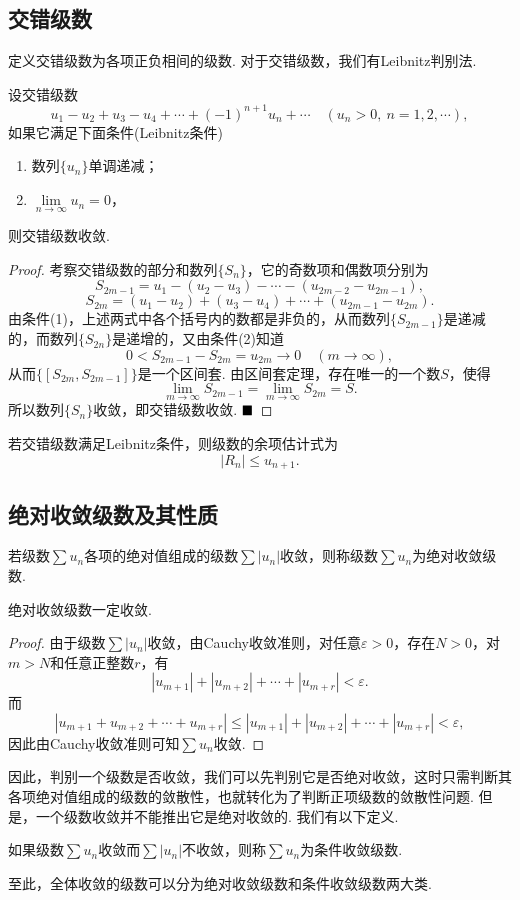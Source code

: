 \subsection{交错级数}
定义{\heiti 交错级数}为各项正负相间的级数. 对于交错级数，我们有Leibnitz判别法.
\begin{theorem}[Leibnitz判别法]
	设交错级数
	$$u_1-u_2+u_3-u_4+\cdots+(-1)^{n+1}u_n+\cdots\quad (u_n>0,\ n=1,2,\cdots),$$
	如果它满足下面条件(Leibnitz条件)
	\begin{enumerate}
		\item 数列$\{u_n\}$单调递减；
		\item $\lim\limits_{n\to\infty}u_n=0$，
	\end{enumerate}
	则交错级数收敛.
\end{theorem}
\begin{proof}
	考察交错级数的部分和数列$\{S_n\}$，它的奇数项和偶数项分别为
	$$S_{2m-1}=u_1-(u_2-u_3)-\cdots-(u_{2m-2}-u_{2m-1}),$$
	$$S_{2m}=(u_1-u_2)+(u_3-u_4)+\cdots+(u_{2m-1}-u_{2m}).$$
	由条件(1)，上述两式中各个括号内的数都是非负的，从而数列$\{S_{2m-1}\}$是递减的，而数列$\{S_{2n}\}$是递增的，又由条件(2)知道
	$$0<S_{2m-1}-S_{2m}=u_{2m}\to 0\quad (m\to\infty),$$
	从而$\{\left[S_{2m},S_{2m-1}\right]\}$是一个区间套. 由区间套定理，存在唯一的一个数$S$，使得
	$$\lim\limits_{m\to\infty}S_{2m-1}=\lim\limits_{m\to\infty}S_{2m}=S.$$
	所以数列$\{S_n\}$收敛，即交错级数收敛. $\hfill\blacksquare$
\end{proof}
\begin{corollary}
	若交错级数满足Leibnitz条件，则级数的余项估计式为
	$$|R_n|\leqslant u_{n+1}.$$
\end{corollary}
\subsection{绝对收敛级数及其性质}
\begin{definition}[绝对收敛级数]
	若级数$\sum u_n$各项的绝对值组成的级数$\sum |u_n|$收敛，则称级数$\sum u_n$为{\heiti 绝对收敛级数}.
\end{definition}
\begin{theorem}
	绝对收敛级数一定收敛.
\end{theorem}
\begin{proof}
	由于级数$\sum |u_n|$收敛，由Cauchy收敛准则，对任意$\varepsilon>0$，存在$N>0$，对$m>N$和任意正整数$r$，有
	$$|u_{m+1}|+|u_{m+2}|+\cdots+|u_{m+r}|<\varepsilon.$$
	而
	$$|u_{m+1}+u_{m+2}+\cdots+u_{m+r}|\leqslant|u_{m+1}|+|u_{m+2}|+\cdots+|u_{m+r}|<\varepsilon,$$
	因此由Cauchy收敛准则可知$\sum u_n$收敛.
\end{proof}
因此，判别一个级数是否收敛，我们可以先判别它是否绝对收敛，这时只需判断其各项绝对值组成的级数的敛散性，也就转化为了判断正项级数的敛散性问题. 但是，一个级数收敛并不能推出它是绝对收敛的. 我们有以下定义.
\begin{definition}[条件收敛级数]
	如果级数$\sum u_n$收敛而$\sum |u_n|$不收敛，则称$\sum u_n$为{\heiti 条件收敛级数}.
\end{definition}
至此，全体收敛的级数可以分为绝对收敛级数和条件收敛级数两大类. 

